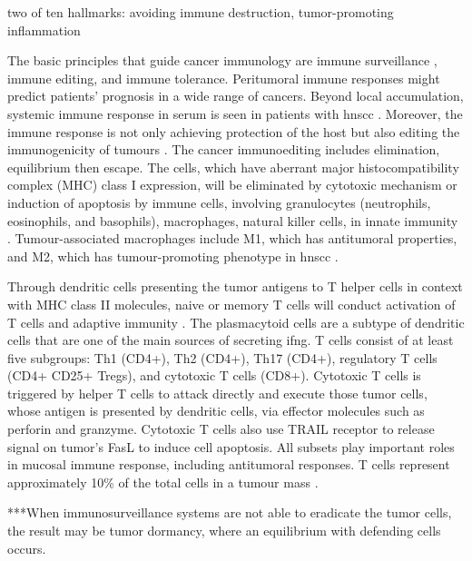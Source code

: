 \documentclass[12pt, a4paper]{article}
\begin{document}
two of ten hallmarks: avoiding immune destruction, tumor-promoting inflammation \citep{Ohman2015}



The basic principles that guide cancer immunology are immune surveillance \citep{BURNET1957, Shankaran2001}, immune editing, and immune tolerance.
Peritumoral immune responses might predict patients’ prognosis in a wide range of cancers. Beyond local accumulation, systemic immune response in serum is seen in patients with \acrshort{hnscc} \citep{Lee2010a}.
Moreover, the immune response is not only achieving protection of the host but also editing the immunogenicity of tumours \citep{Dunn2002}.
The cancer immunoediting includes elimination, equilibrium then escape.
The cells, which have aberrant major histocompatibility complex (MHC) class I expression, will be eliminated by cytotoxic mechanism or induction of apoptosis by immune cells, involving granulocytes (neutrophils, eosinophils, and basophils), macrophages, natural
killer cells, in innate immunity \citep{Tallerico2013}.
Tumour-associated macrophages include  M1, which has antitumoral properties, and M2, which has tumour-promoting phenotype in \acrshort{hnscc} \citep{Kumar2019}.

Through dendritic cells presenting the tumor antigens to T helper cells in context with MHC class II molecules, naive or memory T cells will conduct activation of  T cells and adaptive immunity \citep{Banchereau2000}. 
The plasmacytoid cells are a subtype of dendritic cells that are one of the main sources of secreting \acrshort{ifng}. 
T cells consist of at least five subgroups: Th1 (CD4+), Th2 (CD4+), Th17 (CD4+), regulatory T cells (CD4+ CD25+ Tregs), and cytotoxic T cells (CD8+). 
Cytotoxic T cells is triggered by helper T cells to attack directly and execute those tumor cells, whose antigen is presented by dendritic cells, via effector molecules such as perforin and granzyme. Cytotoxic T cells also use TRAIL receptor to release signal on tumor's FasL to induce cell apoptosis.
All subsets play important roles in mucosal immune response, including antitumoral responses. T cells represent approximately 10\% of the total cells in a tumour mass \citep{Balkwill2012}.

***When immunosurveillance systems are not able to eradicate the tumor cells, the result may be tumor dormancy, where an equilibrium with defending cells occurs.
\end{document}
